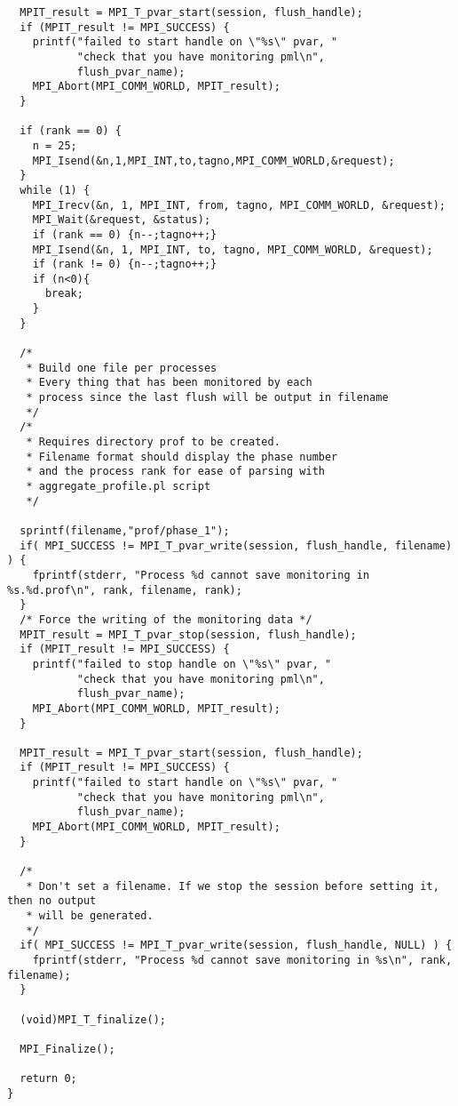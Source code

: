 \documentclass[notitlepage]{article}
\begin{document}
\begin{verbatim}
  MPIT_result = MPI_T_pvar_start(session, flush_handle);
  if (MPIT_result != MPI_SUCCESS) {
    printf("failed to start handle on \"%s\" pvar, "
           "check that you have monitoring pml\n",
           flush_pvar_name);
    MPI_Abort(MPI_COMM_WORLD, MPIT_result);
  }

  if (rank == 0) {
    n = 25;
    MPI_Isend(&n,1,MPI_INT,to,tagno,MPI_COMM_WORLD,&request);
  }
  while (1) {
    MPI_Irecv(&n, 1, MPI_INT, from, tagno, MPI_COMM_WORLD, &request);
    MPI_Wait(&request, &status);
    if (rank == 0) {n--;tagno++;}
    MPI_Isend(&n, 1, MPI_INT, to, tagno, MPI_COMM_WORLD, &request);
    if (rank != 0) {n--;tagno++;}
    if (n<0){
      break;
    }
  }

  /* 
   * Build one file per processes
   * Every thing that has been monitored by each
   * process since the last flush will be output in filename
   */
  /*
   * Requires directory prof to be created.
   * Filename format should display the phase number
   * and the process rank for ease of parsing with
   * aggregate_profile.pl script
   */

  sprintf(filename,"prof/phase_1");
  if( MPI_SUCCESS != MPI_T_pvar_write(session, flush_handle, filename) ) {
    fprintf(stderr, "Process %d cannot save monitoring in %s.%d.prof\n", rank, filename, rank);
  }
  /* Force the writing of the monitoring data */
  MPIT_result = MPI_T_pvar_stop(session, flush_handle);
  if (MPIT_result != MPI_SUCCESS) {
    printf("failed to stop handle on \"%s\" pvar, "
           "check that you have monitoring pml\n",
           flush_pvar_name);
    MPI_Abort(MPI_COMM_WORLD, MPIT_result);
  }

  MPIT_result = MPI_T_pvar_start(session, flush_handle);
  if (MPIT_result != MPI_SUCCESS) {
    printf("failed to start handle on \"%s\" pvar, "
           "check that you have monitoring pml\n",
           flush_pvar_name);
    MPI_Abort(MPI_COMM_WORLD, MPIT_result);
  }

  /* 
   * Don't set a filename. If we stop the session before setting it, then no output
   * will be generated.
   */
  if( MPI_SUCCESS != MPI_T_pvar_write(session, flush_handle, NULL) ) {
    fprintf(stderr, "Process %d cannot save monitoring in %s\n", rank, filename);
  }

  (void)MPI_T_finalize();

  MPI_Finalize();
  
  return 0;
}

\end{verbatim}
\end{document}
